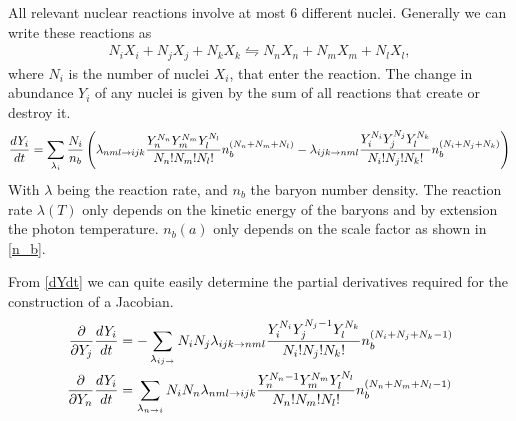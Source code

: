 All relevant nuclear reactions involve at most 6 different nuclei. Generally we can write these reactions as
\begin{align}
    N_i X_i + N_j X_j + N_k X_k \leftrightharpoons N_n X_n + N_m X_m + N_l X_l ,
\end{align}
where $N_i$ is the number of nuclei $X_i$, that enter the reaction. 
The change in abundance $Y_i$ of any nuclei is given by the sum of all reactions that create or destroy it.
\begin{align}
    \frac{dY_i}{dt}=\sum_{\lambda_i}\frac{N_i}{n_b}\left(\lambda_{n m l \rightarrow i j k} \frac{Y_n^{N_n}Y_m^{N_m}Y_l^{N_l}}{N_n!N_m!N_l!}n_b^{(N_n+N_m+N_l)}-\lambda_{i j k \rightarrow n m l}\frac{Y_i^{N_i}Y_j^{N_j}Y_l^{N_k}}{N_i!N_j!N_k!}n_b^{(N_i+N_j+N_k)}\right)
    \label{dYdt}
\end{align}
With $\lambda$ being the reaction rate, and $n_b$ the baryon number density. The reaction rate $\lambda(T)$ only depends on the kinetic energy of the baryons and by extension the photon temperature. $n_b(a)$ only depends on the scale factor as shown in \eqref{n_b}. 

From \eqref{dYdt} we can quite easily determine the partial derivatives required for the construction of a Jacobian. 
\begin{align}
    \frac{\partial }{\partial Y_j}\frac{dY_i}{dt}&=-\sum_{\lambda_{ij\rightarrow}}N_i N_j\lambda_{i j k \rightarrow n m l}\frac{Y_i^{N_i}Y_j^{N_j-1}Y_l^{N_k}}{N_i!N_j!N_k!}n_b^{(N_i+N_j+N_k-1)}\label{eq:jacterms1}\\
    \frac{\partial }{\partial Y_n}\frac{dY_i}{dt}&=\sum_{\lambda_{n \rightarrow i }}N_i N_n\lambda_{n m l \rightarrow i j k} \frac{Y_n^{N_n-1}Y_m^{N_m}Y_l^{N_l}}{N_n!N_m!N_l!}n_b^{(N_n+N_m+N_l-1)}
    \label{eq:jacterms2}
\end{align}


